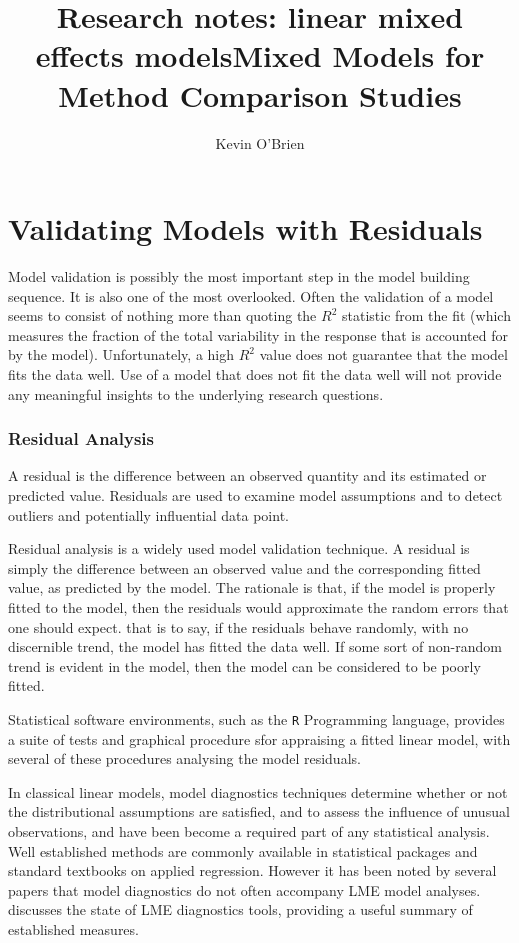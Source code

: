 \documentclass[12pt, a4paper]{report}
\title{Research notes: linear mixed effects models}
\author{ } \date{ }
\theoremstyle{plain}
\theoremstyle{definition}
\theoremstyle{remark}
\begin{document}
	\author{Kevin O'Brien}
	\title{Mixed Models for Method Comparison Studies}
	\tableofcontents
	
	\newpage
	\section{Validating Models with Residuals}
	Model validation is possibly the most important step in the model building sequence. It is also one of the most overlooked. Often the validation of a model seems to consist of nothing more than quoting the $R^2$ statistic from the fit (which measures the fraction of the total variability in the response that is accounted for by the model). Unfortunately, a high $R^2$ value does not guarantee that the model fits the data well. Use of a model that does not fit the data well will not provide any meaningful insights to the underlying research questions.
	
	\subsubsection{Residual Analysis}
	A residual is the difference between an observed quantity and its estimated or predicted value. Residuals are used to examine model assumptions and to detect outliers and potentially influential data	point. 
	
	Residual analysis is a widely used model validation technique. A residual is simply the difference between an observed value and the corresponding fitted value, as predicted by the model. The rationale is that, if the model is properly fitted to the model, then the residuals would approximate the random errors that one should expect.
	that is to say, if the residuals behave randomly, with no discernible trend, the model has fitted the data well. If some sort of non-random trend is evident in the model, then the model can be considered to be poorly fitted.
		
			Statistical software environments, such as the \texttt{R} Programming language, provides a suite of tests and graphical procedure sfor appraising a fitted linear model, with several 
			of these procedures analysing the model residuals.
			
			In classical linear models, model diagnostics techniques determine whether or not the distributional assumptions are satisfied, and to assess the influence of unusual observations, and have been become a required part of any statistical analysis. Well established methods are commonly available in statistical packages and standard textbooks on applied regression. However it has been noted by several papers that model diagnostics do not often accompany LME model analyses. \citet{schabenberger} discusses the state of LME diagnostics tools, providing a useful summary of established measures.
			
\end{document}
